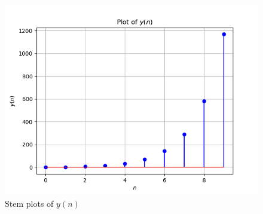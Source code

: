 \documentclass[journal,12pt,onecolumn]{IEEEtran}
\theoremstyle{remark}
\begin{document}
\begin{figure}[h!]
    \centering
    \includegraphics[width=\columnwidth]{ncert-maths/11/9/3/14/figs/plot.png}
    \caption{Stem plots of $y(n)$}
    \label{fig:11.9.3.14.2}
\end{figure}
\end{document}
